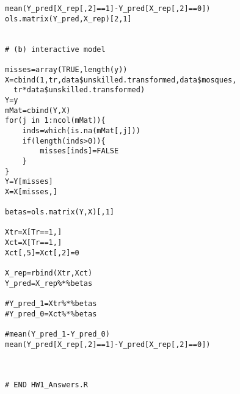 \documentclass{article}
\begin{document}
\begin{verbatim}
mean(Y_pred[X_rep[,2]==1]-Y_pred[X_rep[,2]==0])
ols.matrix(Y_pred,X_rep)[2,1]
            

# (b) interactive model

misses=array(TRUE,length(y))
X=cbind(1,tr,data$unskilled.transformed,data$mosques,
  tr*data$unskilled.transformed)          
Y=y          
mMat=cbind(Y,X)
for(j in 1:ncol(mMat)){
	inds=which(is.na(mMat[,j])) 
	if(length(inds>0)){
		misses[inds]=FALSE 
	}	
}
Y=Y[misses]
X=X[misses,]
   
betas=ols.matrix(Y,X)[,1]     
           
Xtr=X[Tr==1,]
Xct=X[Tr==1,]   
Xct[,5]=Xct[,2]=0
            
X_rep=rbind(Xtr,Xct)  
Y_pred=X_rep%*%betas

#Y_pred_1=Xtr%*%betas
#Y_pred_0=Xct%*%betas
                
#mean(Y_pred_1-Y_pred_0)   
mean(Y_pred[X_rep[,2]==1]-Y_pred[X_rep[,2]==0])
            


# END HW1_Answers.R
           

\end{verbatim}
\end{document}
